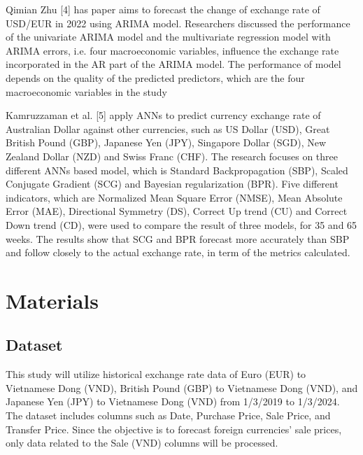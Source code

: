 \documentclass{ieeeojies}
\begin{document}
Qimian Zhu [4] has paper aims to forecast the change of exchange rate of USD/EUR in 2022 using ARIMA model. Researchers discussed the performance of the univariate ARIMA model and the multivariate regression model with ARIMA errors, i.e. four macroeconomic variables, influence the exchange rate incorporated in the AR part of the ARIMA model. The performance of model depends on the quality of the predicted predictors, which are the four macroeconomic variables in the study

Kamruzzaman et al. [5] apply ANNs to predict currency exchange rate of Australian Dollar against other currencies, such as US Dollar (USD), Great British Pound (GBP), Japanese Yen (JPY), Singapore Dollar (SGD), New Zealand Dollar (NZD) and Swiss Franc (CHF). The research focuses on three different ANNs based model, which is Standard Backpropagation (SBP), Scaled Conjugate Gradient (SCG) and Bayesian regularization (BPR). Five different indicators, which are Normalized Mean Square Error (NMSE), Mean Absolute Error (MAE), Directional Symmetry (DS), Correct Up
trend (CU) and Correct Down trend (CD), were used to compare the result of three models, for 35 and 65 weeks. The results show that SCG and BPR forecast more accurately than SBP and follow closely to the actual exchange rate, in term of the metrics calculated.


\section{Materials}
\subsection{Dataset}

This study will utilize historical exchange rate data of Euro (EUR) to Vietnamese Dong (VND), British Pound (GBP) to Vietnamese Dong (VND), and Japanese Yen (JPY) to Vietnamese Dong (VND) from 1/3/2019 to 1/3/2024. The dataset includes columns such as Date, Purchase Price, Sale Price, and Transfer Price. Since the objective is to forecast foreign currencies' sale prices, only data related to the Sale (VND) columns will be processed.
\end{document}
